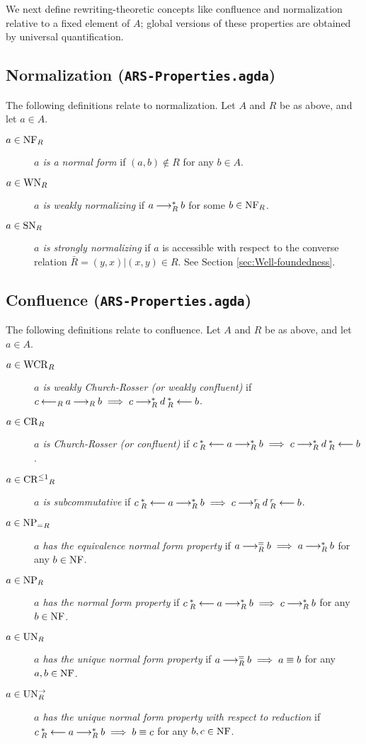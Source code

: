 We next define rewriting-theoretic concepts like confluence and normalization relative to a fixed element of $A$; global versions of these properties are obtained by universal quantification.
\subsection{Normalization (\texttt{ARS-Properties.agda})}
\begin{definition} The following definitions relate to normalization. Let $A$ and $R$ be as above, and let $a \in A$.
  \begin{description}
    \item[$a \in \mathrm{NF}_R$] \emph{$a$ is a normal form} if $(a,b) \notin R$ for any $b \in A$.   
    \item[$a \in \mathrm{WN}_R$] \emph{$a$ is weakly normalizing} if $a \mathbin{\longrightarrow_R^*} b$ for some $b \in \mathrm{NF}_R$.
    \item[$a \in \mathrm{SN}_R$] \emph{$a$ is strongly normalizing} if $a$ is accessible with respect to the converse relation $\bar{R} = {(y,x) | (x,y) \in R}$. See Section \ref{sec:Well-foundedness}. 
  \end{description}
\end{definition} 

 

\subsection{Confluence (\texttt{ARS-Properties.agda})}
\begin{definition} The following definitions relate to confluence. Let $A$ and $R$ be as above, and let $a \in A$.
    \begin{description}
        \item[$a \in \mathrm{WCR}_R$] \emph{$a$ is weakly Church-Rosser (or weakly confluent)} if $c \mathbin{\longleftarrow_R} a \mathbin{\longrightarrow_R} b \implies c \mathbin{\longrightarrow_R^*} d \mathbin{_R^*\longleftarrow} b$.
        \item[$a \in \mathrm{CR}_R$] \emph{$a$ is Church-Rosser (or confluent)} if $c \mathbin{_R^*\longleftarrow} a \mathbin{\longrightarrow_R^*} b \implies c \mathbin{\longrightarrow_R^*} d \mathbin{_R^*\longleftarrow} b$.
        \item[$a \in \mathrm{CR^{\le 1}}_R$] \emph{$a$ is subcommutative} if $c \mathbin{_R^*\longleftarrow} a \mathbin{\longrightarrow_R^*} b \implies c \mathbin{\longrightarrow_R^r} d \mathbin{_R^r\longleftarrow} b$.
        \item[$a \in \mathrm{NP_=}_R$] \emph{$a$ has the equivalence normal form property} if $a \mathbin{\longrightarrow_R^=} b \implies a\mathbin{\longrightarrow_R^*} b$ for any $b \in \mathrm{NF}$.
        \item[$a \in \mathrm{NP}_R$] \emph{$a$ has the normal form property} if $c \mathbin{_R^*\longleftarrow} a \mathbin{\longrightarrow_R^*} b \implies c \mathbin{\longrightarrow_R^*} b$ for any $b \in \mathrm{NF}$. 
        \item[$a \in \mathrm{UN}_R$] \emph{$a$ has the unique normal form property} if $a \mathbin{\longrightarrow_R^=} b \implies a \equiv b$  for any $a, b \in \mathrm{NF}$.
        \item[$a \in \mathrm{UN}^{\to}_R$] \emph{$a$ has the unique normal form property with respect to reduction} if $c \mathbin{_R^*\longleftarrow} a \mathbin{\longrightarrow_R^*} b  \implies b \equiv c$  for any $b, c \in \mathrm{NF}$.
    \end{description}
\end{definition}

